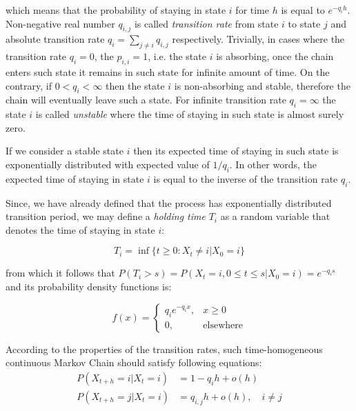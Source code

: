 which means that the probability of staying in state $i$ for time $h$ is equal to $e^{-{q_i}h}$. 
Non-negative real number $q_{i,j}$ is called {\it transition rate} from state $i$ to state $j$ and absolute transition 
rate $q_i = \sum_{j \neq i} q_{i,j}$ respectively. Trivially, in cases where the transition rate $q_i=0$, the $p_{i,i} = 1$, i.e. the state $i$ is absorbing, 
once the chain enters such state it remains in such state for infinite amount of time. On the contrary, if $0 < q_i < \infty$ then the state $i$ is non-absorbing and stable, therefore
the chain will eventually leave such a state. For infinite transition rate $q_i = \infty$ the state $i$ is called {\it unstable} where the time of staying in such state is almost surely zero.

If we consider a stable state $i$ then its expected time of staying in such state is exponentially 
distributed with expected value of $1/q_i$. In other words, the expected time of staying in state $i$ is equal 
to the inverse of the transition rate $q_i$.

Since, we have already defined that the process has exponentially distributed transition period, we may define a {\it holding time} $T_i$ as a random variable that denotes the time of staying in state $i$:

\begin{equation}
T_i = \inf \{t \geq 0 : X_t \neq i | X_0 = i\}
\end{equation}

from which it follows that $P(T_i>s) = P(X_t=i,0 \leq t \leq s|X_0=i) = e^{-q_i s}$ and its probability density functions is:

\begin{equation}
    f(x) = 
    \begin{cases}
        q_i e^{-q_i x}, & x \geq 0\\
        0, & \text{elsewhere}
    \end{cases}
\end{equation}

According to the properties of the transition rates, such time-homogeneous continuous Markov Chain should satisfy following equations:
\begin{equation}
    \begin{aligned}
    P(X_{t+h}=i|X_t=i) &= 1 - q_i h + o(h) \\
    P(X_{t+h}=j|X_t=i) &= q_{i,j} h + o(h), \quad i \neq j
    \end{aligned}
\end{equation}

